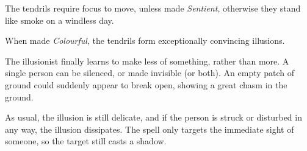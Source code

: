 \begin{multicols}{2}
The tendrils require focus to move, unless made \textit{Sentient}, otherwise they stand like smoke on a windless day.

When made \textit{Colourful}, the tendrils form exceptionally convincing illusions.


The illusionist finally learns to make less of something, rather than more.  A single person can be silenced, or made invisible (or both).
An empty patch of ground could suddenly appear to break open, showing a great chasm in the ground.

As usual, the illusion is still delicate, and if the person is struck or disturbed in any way, the illusion dissipates.
The spell only targets the immediate sight of someone, so the target still casts a shadow\iftoggle{verbose}{(though the caster can still remove this with the Muffle spell, above)}{}.

\end{multicols}


